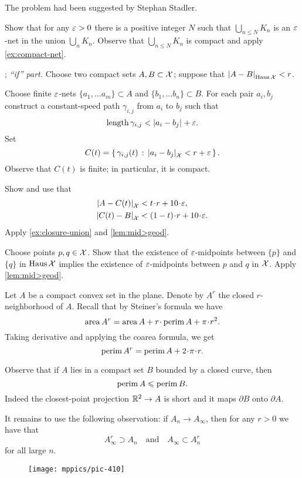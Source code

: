  The problem had been suggested by Stephan Stadler.

Show that for any $\varepsilon>0$ there is a positive integer $N$ such that $\bigcup_{n\le N} K_n$ is an $\varepsilon$-net in the union $\bigcup_{n} K_n$.
Observe that $\bigcup_{n\le N} K_n$
is compact and apply \ref{ex:compact-net}.

\parbf{\ref{ex:Haus-length}}; \textit{``if'' part.}
Choose two compact sets $A,B\subset \mathcal{X}$;
suppose that $\dist{A}{B}{\Haus\spc{X}}<r$.

Choose finite $\varepsilon$-nets $\{a_1,\dots a_m\}\subset A$ and $\{b_1,\dots b_n\}\subset B$.
For each pair $a_i,b_j$ construct a constant-speed path $\gamma_{i,j}$ from $a_i$ to $b_j$ such that 
\[\length \gamma_{i,j}<\dist{a_i}{b_j}{}+\eps.\]
Set 
\[C(t)=\set{\gamma_{i,j}(t)}{\dist{a_i}{b_j}{\spc{X}}<r+\eps}.\]
Observe that $C(t)$ is finite; in particular, it is compact.

Show and use that 
\begin{align*}
\dist{A}{C(t)}{\spc{X}}&<t\cdot r+10\cdot\eps,
\\
\dist{C(t)}{B}{\spc{X}}&<(1-t)\cdot r+10\cdot\eps.
\end{align*}
Apply \ref{ex:closure-union} and \ref{lem:mid>geod}.

Choose points $p,q\in\mathcal{X}$. 
Show that the existence of $\varepsilon$-midpoints between $\{p\}$ and $\{q\}$ in $\operatorname{\rm Haus}\nolimits\mathcal{X}$ implies the existence of $\varepsilon$-midpoints between $p$ and $q$ in $\mathcal{X}$.
Apply \ref{lem:mid>geod}.


Let $A$ be a compact convex set in the plane.
Denote by $A^r$ the closed $r$-neighborhood of $A$.
Recall that by Steiner's formula we have
\[\area A^r=\area A+r\cdot\perim A+\pi\cdot r^2.\]
Taking derivative and applying the coarea formula, we get 
\[\perim A^r=\perim A+2\cdot\pi\cdot r.\]

Observe that if $A$ lies in a compact set $B$ bounded by a closed curve, then 
\[\operatorname{\rm perim}\nolimits A\leqslant \operatorname{\rm perim}\nolimits B.\]
Indeed the closest-point projection $\mathbb{R}^2\to A$ is short and it maps $\partial B$ onto $\partial A$.

It remains to use the following observation: if $A_n\to A_\infty$, then for any $r>0$ we have that
\[A_\infty^r\supset A_n
\quad\text{and}\quad
A_\infty\subset A_n^r\]
for all large $n$.

\begin{wrapfigure}{r}{27 mm}
\vskip-0mm
\centering
\texttt{[image: mppics/pic-410]}
\end{wrapfigure}

